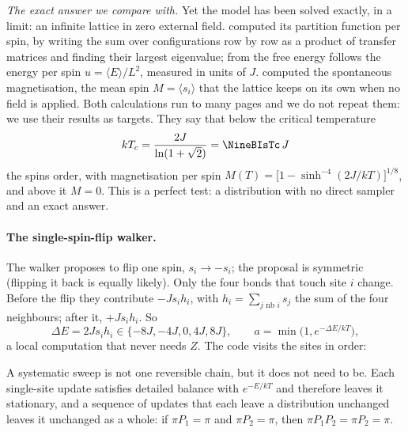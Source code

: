\emph{The exact answer we compare with.} Yet the model has been solved exactly, in a limit: an
infinite lattice in zero external field. \textcite{Onsager1944} computed its partition function
per spin, by writing the sum over configurations row by row as a product of transfer matrices
and finding their largest eigenvalue; from the free energy follows the energy per spin
$u=\langle E\rangle/L^2$, measured in units of $J$. \textcite{Yang1952} computed the spontaneous
magnetisation, the mean spin $M=\langle s_i\rangle$ that the lattice keeps on its own when no
field is applied. Both calculations run to many pages and we do not repeat them: we use their
results as targets. They say that below the critical temperature
\begin{equation}
  kT_c=\frac{2J}{\ln(1+\sqrt2)}=\NineBIsTc\,J
  \label{9b:eq:tc}
\end{equation}
the spins order, with magnetisation per spin $M(T)=\bigl[1-\sinh^{-4}(2J/kT)\bigr]^{1/8}$, and
above it $M=0$. This is a perfect test: a distribution with no direct sampler and an exact answer.

\paragraph{The single-spin-flip walker.}
The walker proposes to flip one spin, $s_i\to-s_i$; the proposal is symmetric (flipping it back
is equally likely). Only the four bonds that touch site $i$ change. Before the flip they
contribute $-Js_ih_i$, with $h_i=\sum_{j\text{ nb } i}s_j$ the sum of the four neighbours; after
it, $+Js_ih_i$. So
\begin{equation}
  \Delta E=2Js_ih_i\in\{-8J,-4J,0,4J,8J\},
  \qquad
  a=\min\bigl(1,e^{-\Delta E/kT}\bigr),
  \label{9b:eq:ising-flip}
\end{equation}
a local computation that never needs $Z$. The code visits the sites in order:


A systematic sweep is not one reversible chain, but it does not need to be. Each single-site
update satisfies detailed balance with $e^{-E/kT}$ and therefore leaves it stationary, and a
sequence of updates that each leave a distribution unchanged leaves it unchanged as a whole:
if $\pi P_1=\pi$ and $\pi P_2=\pi$, then $\pi P_1P_2=\pi P_2=\pi$.

